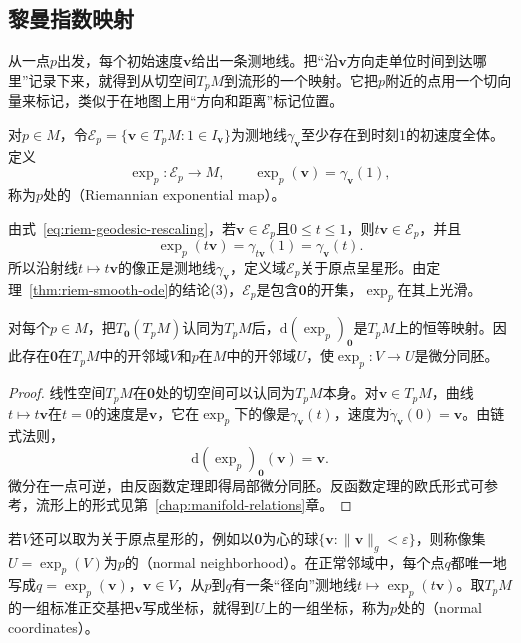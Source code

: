 \subsection{黎曼指数映射}
\label{sec:riem-exponential-map}

从一点$p$出发，每个初始速度$\bm v$给出一条测地线。把“沿$\bm v$方向走单位时间到达哪里”记录下来，就得到从切空间$T_pM$到流形的一个映射。它把$p$附近的点用一个切向量来标记，类似于在地图上用“方向和距离”标记位置。

\begin{definition}[黎曼指数映射]
\label{def:riem-exponential-map}
对$p\in M$，令$\mathcal E_p=\{\bm v\in T_pM:1\in I_{\bm v}\}$为测地线$\gamma_{\bm v}$至少存在到时刻$1$的初速度全体。定义
\begin{equation}
\exp_p:\mathcal E_p\to M,\qquad\exp_p(\bm v)=\gamma_{\bm v}(1),
\label{eq:riem-exp-definition}
\end{equation}
称为$p$处的（Riemannian exponential map）。
\end{definition}

由式~\eqref{eq:riem-geodesic-rescaling}，若$\bm v\in\mathcal E_p$且$0\leq t\leq1$，则$t\bm v\in\mathcal E_p$，并且
\[
\exp_p(t\bm v)=\gamma_{t\bm v}(1)=\gamma_{\bm v}(t).
\]
所以沿射线$t\mapsto t\bm v$的像正是测地线$\gamma_{\bm v}$，定义域$\mathcal E_p$关于原点呈星形。由定理~\ref{thm:riem-smooth-ode}的结论(3)，$\mathcal E_p$是包含$\bm 0$的开集，$\exp_p$在其上光滑。

\begin{theorem}[指数映射的局部可逆性]
\label{thm:riem-exp-local-diffeo}
对每个$p\in M$，把$T_{\bm 0}(T_pM)$认同为$T_pM$后，$\mathrm d(\exp_p)_{\bm 0}$是$T_pM$上的恒等映射。因此存在$\bm 0$在$T_pM$中的开邻域$V$和$p$在$M$中的开邻域$U$，使$\exp_p:V\to U$是微分同胚。
\end{theorem}

\begin{proof}
线性空间$T_pM$在$\bm 0$处的切空间可以认同为$T_pM$本身。对$\bm v\in T_pM$，曲线$t\mapsto t\bm v$在$t=0$的速度是$\bm v$，它在$\exp_p$下的像是$\gamma_{\bm v}(t)$，速度为$\dot\gamma_{\bm v}(0)=\bm v$。由链式法则，
\[
\mathrm d(\exp_p)_{\bm 0}(\bm v)=\bm v .
\]
微分在一点可逆，由反函数定理即得局部微分同胚。反函数定理的欧氏形式可参考，流形上的形式见第~\ref{chap:manifold-relations}章。
\end{proof}

若$V$还可以取为关于原点星形的，例如以$\bm 0$为心的球$\{\bm v:\lVert\bm v\rVert_g<\varepsilon\}$，则称像集$U=\exp_p(V)$为$p$的（normal neighborhood）。在正常邻域中，每个点$q$都唯一地写成$q=\exp_p(\bm v)$，$\bm v\in V$，从$p$到$q$有一条“径向”测地线$t\mapsto\exp_p(t\bm v)$。取$T_pM$的一组标准正交基把$\bm v$写成坐标，就得到$U$上的一组坐标，称为$p$处的（normal coordinates）。

